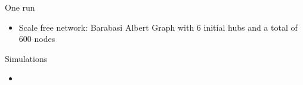 \documentclass[xcolor=table,handout]{beamer}
\begin{document}
\begin{frame}{One run}
\begin{itemize}
	\item Scale free network: Barabasi Albert Graph with 6 initial hubs and a total of 600 nodes
\end{itemize}


\end{frame}

\begin{frame}{Simulations}
\begin{itemize} \item
\end{itemize}
\end{frame}
\end{document}
